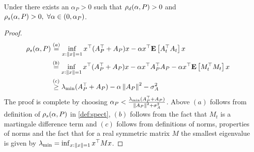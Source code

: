 \begin{lemma}\label{lm:pd}
Under  there exists an $\alpha_P>0$ such that $\rho_d(\alpha,P)>0$ and $\rho_s(\alpha,P)>0,~\forall \alpha \in (0,\alpha_P)$.
\end{lemma}
\begin{proof}
\begin{align*}
\rho_s(\alpha,P)&\stackrel{(a)}{=}\inf_{x:\left\| x\right\|=1}x^\top (A_P^\top+A_P)x -\alpha x^\top\mathbf{E}\left[A_t^\top A_t\right] x\\
&\stackrel{(b)}{=}\inf_{x:\left\| x\right\|=1}x^\top (A_P^\top+A_P)x -\alpha x^\top A^\top_P A_P -\alpha x^\top \mathbf{E}\left[M_t^\top M_t\right] x\\
&\stackrel{(c)}{\geq} \lambda_{\min}(A^\top_P+A_P)-\alpha \left\| A_P\right\|^2-\sigma^2_A
\end{align*}
The proof is complete by choosing $\alpha_P<\frac{\lambda_{\min}(A^\top_P+A_P)}{\left\| A_P\right\|^2+\sigma^2_A}$. Above $(a)$ follows from definition of $\rho_s(\alpha,P)$ in \cref{def:spect}, $(b)$ follows from the fact that $M_t$ is a martingale difference term and $(c)$ follows from definitions of norms, properties of norms and the fact that for a real symmetric matrix $M$ the smallest eigenvalue is given by $\lambda_{\min}=\inf_{x:\left\| x\right\|=1} x^\top M x $.
\end{proof}





